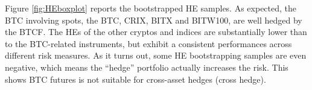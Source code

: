 
Figure \ref{fig:HEboxplot} reports the bootstrapped HE samples.
As expected, the BTC involving spots, the BTC, CRIX, BITX and BITW100, are well hedged
by the BTCF. 
The HEs of the other cryptos and indices are
substantially lower than to the BTC-related instruments, but 
exhibit a consistent performances across different risk measures. 
As it turns out, some HE bootstrapping samples are even negative,
which means the ``hedge'' portfolio actually increases the risk. 
This shows BTC futures is not suitable for cross-asset hedges (cross hedge).







